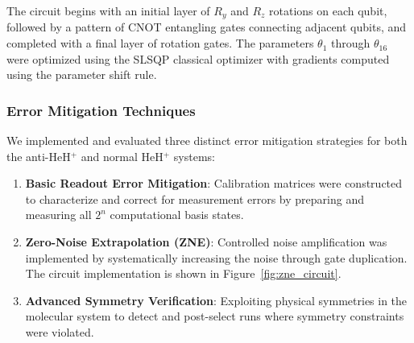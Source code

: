 \documentclass[10pt,twocolumn,a4paper]{article}
\begin{document}
The circuit begins with an initial layer of $R_y$ and $R_z$ rotations on each qubit, followed by a pattern of CNOT entangling gates connecting adjacent qubits, and completed with a final layer of rotation gates. The parameters $\theta_1$ through $\theta_{16}$ were optimized using the SLSQP classical optimizer with gradients computed using the parameter shift rule.

\subsubsection{Error Mitigation Techniques}
We implemented and evaluated three distinct error mitigation strategies for both the anti-HeH$^+$ and normal HeH$^+$ systems:

\begin{enumerate}
    \item \textbf{Basic Readout Error Mitigation}: Calibration matrices were constructed to characterize and correct for measurement errors by preparing and measuring all $2^n$ computational basis states.
    
    \item \textbf{Zero-Noise Extrapolation (ZNE)}: Controlled noise amplification was implemented by systematically increasing the noise through gate duplication. The circuit implementation is shown in Figure~\ref{fig:zne_circuit}.
    
    \item \textbf{Advanced Symmetry Verification}: Exploiting physical symmetries in the molecular system to detect and post-select runs where symmetry constraints were violated.
\end{enumerate}
\end{document}
